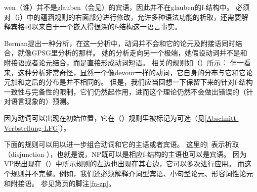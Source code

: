 {\noindent
wen（谁）并不是glauben（会见）的宾语，因此并不在glauben的f-结构中。
必须对（i）中的蕴涵规则的右面部分进行修改，允许多种语法功能的析取，还需要解释宾格可以来自于一个嵌入得很深的f-结构这一语言事实。
\ea
\label{le-verschlingen}
\z

\largerpage
\noindent
Berman提出一种分析，在这一分析中，动词并不会和它的论元及附接语同时结合，就像GPSG\indexgpsgc 里分析的那样。
她的分析走向另一个极端，她假设动词并不是和附接语或者论元结合，而是直接形成动词短语。
相关的规则如（）所示：
\ea
\label{LFG-v-vp}
\z
乍一看来，这种分析非常奇怪，显然一个像devour一样的动词，它自身的分布与它和它论元加和之后的分布是并不相同的。
但是，我们应当回想一下保留下来的针对f-结构一致性与完备性的限制，它们仍然起作用，进而这个理论仍然不会做出错误的（针对语言现象的）预测。
}%

因为动词可以出现在初始位置，它在（）规则里被标记为可选（见\ref{Abschnitt-Verbstellung-LFG}）。

下面的规则可以用以进一步组合动词和它的主语或者宾语。
\ea
\label{lfg-vp-regel}
\z
这里的|
\isc{$\vert$}\is{$\vert$}表示析取（disjunction
），也就是说，NP既可以是相应f-结构的主语也可以是宾语。
因为VP既出现在（）中所示规则的左边也出现在其右边，它可以多次进行应用。
而这个规则并不完整。例如，我们还必须解释介词型宾语、小句型论元、形容词性论元和附接语。
参见第\pageref{fn-zp}页的脚注\ref{fn-zp}。

